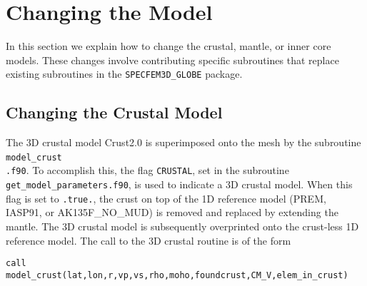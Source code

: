 \chapter{Changing the Model}\label{cha:-Changing-the}

In this section we explain how to change the crustal, mantle, or inner
core models. These changes involve contributing specific subroutines
that replace existing subroutines in the \texttt{SPECFEM3D\_GLOBE}
package.


\section{Changing the Crustal Model}\label{sec:Changing-the-Crustal}

The 3D crustal model Crust2.0 \citep{BaLaMa00} is superimposed onto
the mesh by the subroutine \texttt{model\_crust}~\\
\texttt{.f90}. To accomplish this, the flag \texttt{CRUSTAL}, set
in the subroutine \texttt{get\_model\_parameters.f90}, is used
to indicate a 3D crustal model. When this flag is set to \texttt{.true.},
the crust on top of the 1D reference model (PREM, IASP91, or AK135F\_NO\_MUD)
is removed and replaced by extending the mantle. The 3D crustal model
is subsequently overprinted onto the crust-less 1D reference model.
The call to the 3D crustal routine is of the form
\begin{verbatim}
call model_crust(lat,lon,r,vp,vs,rho,moho,foundcrust,CM_V,elem_in_crust)
\end{verbatim}

